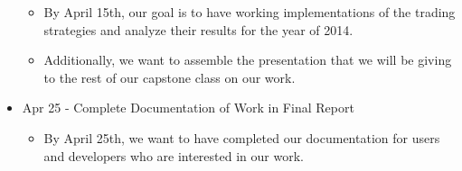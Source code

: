 \begin{itemize}
  \begin{itemize}
  \item By April 15th, our goal is to have working implementations of the trading strategies and analyze their results for the year of 2014.
  \item Additionally, we want to assemble the presentation that we will be giving to the rest of our capstone class on our work.
  \end{itemize}
\item Apr 25 - Complete Documentation of Work in Final Report
  \begin{itemize}
  \item By April 25th, we want to have completed our documentation for users and developers who are interested in our work.
  \end{itemize}
\end{itemize}


